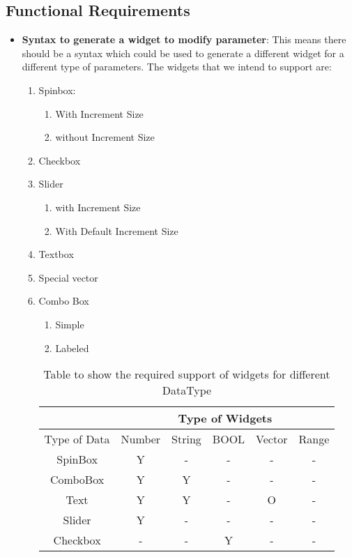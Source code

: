 \subsection{Functional Requirements}
\begin{itemize}
    \item {\bf Syntax to generate a widget to modify parameter}: This means there should be a syntax which could be used to generate a different widget for a different type of parameters.
    The widgets that we intend to support are:
    \begin{enumerate}
        \item Spinbox:
            \begin{enumerate}
                \item With Increment Size
                \item without Increment Size
            \end{enumerate}
        \item Checkbox
        \item Slider
            \begin{enumerate}
                \item with Increment Size
                \item With Default Increment Size
            \end{enumerate}
        \item Textbox
        \item Special vector
        \item Combo Box
            \begin{enumerate}
                \item Simple
                \item Labeled
            \end{enumerate}
   
    \begin{table}[h]
        \centering
        \begin{tabular}{ |c|c|c|c|c|c| }
            \hline
            & \multicolumn{5}{|c|}{Type of Widgets} \\
            \hline
            Type of Data&    Number&    String&    BOOL &Vector &Range     \\ [0.5ex]
            \hline
            SpinBox&Y&    -&    -&    -&    - \\ \hline
            ComboBox&    Y&    Y&    -&    -&    - \\ \hline
            Text&    Y&    Y&    -&    O&    - \\ \hline
            Slider&    Y&    -&    -&    -&    - \\ \hline
            Checkbox&    -&    -&    Y&    -&    - \\ [1ex]
            \hline
        \end{tabular}
        \caption{Table to show the required support of widgets for different DataType}
        \label{table2}
    \end{table}
   

\end{enumerate}
\end{itemize}
